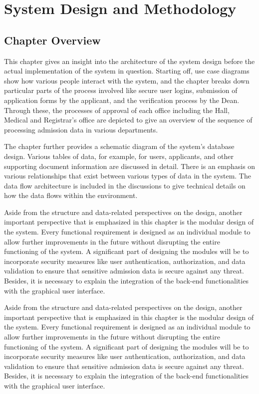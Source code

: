 \chapter{System Design and Methodology}
\label{ch:system_design}

\section{Chapter Overview}

This chapter gives an insight into the architecture of the system design before the actual implementation of the system in question. Starting off, use case diagrams show how various people interact with the system, and the chapter breaks down particular parts of the process involved like secure user logins, submission of application forms by the applicant, and the verification process by the Dean. Through these, the processes of approval of each office including the Hall, Medical and Registrar's office are depicted to give an overview of the sequence of processing admission data in various departments.

\vspace{0.5cm}

\noindent The chapter further provides a schematic diagram of the system's database design. Various tables of data, for example, for users, applicants, and other supporting document information are discussed in detail. There is an emphasis on various relationships that exist between various types of data in the system. The data flow architecture is included in the discussions to give technical details on how the data flows within the environment.

\vspace{0.5cm}
\noindent Aside from the structure and data-related perspectives on the design, another important perspective that is emphasized in this chapter is the modular design of the system. Every functional requirement is designed as an individual module to allow further improvements in the future without disrupting the entire functioning of the system. A significant part of designing the modules will be to incorporate security measures like user authentication, authorization, and data validation to ensure that sensitive admission data is secure against any threat. Besides, it is necessary to explain the integration of the back-end functionalities with the graphical user interface.

\vspace{0.5cm}
\noindent Aside from the structure and data-related perspectives on the design, another important perspective that is emphasized in this chapter is the modular design of the system. Every functional requirement is designed as an individual module to allow further improvements in the future without disrupting the entire functioning of the system. A significant part of designing the modules will be to incorporate security measures like user authentication, authorization, and data validation to ensure that sensitive admission data is secure against any threat. Besides, it is necessary to explain the integration of the back-end functionalities with the graphical user interface.

